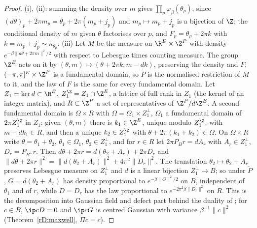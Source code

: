 \begin{proof}
(i), (ii): summing the density over $m$ gives $\prod_p\varphi_\beta(\theta_p)$,
since $(d\theta)_p+2\pi m_p=\theta_p+2\pi(m_p+j_p)$ and $m_p\mapsto m_p+j_p$
is a bijection of $\Z$; the conditional density of $m$ given $\theta$
factorises over $p$, and $F_p=\theta_p+2\pi k$ with $k=m_p+j_p\sim\kappa_{
\theta_p}$. (iii) Let $M$ be the measure on $\R^E\times\Z^P$ with density
$e^{-\beta\lVert d\theta+2\pi m\rVert^2/2}$ with respect to Lebesgue times
counting measure. The group $\Z^E$ acts on it by $(\theta,m)\mapsto(\theta+
2\pi k,m-dk)$, preserving the density and $F$; $(-\pi,\pi]^E\times\Z^P$ is a
fundamental domain, so $\tilde P$ is the normalised restriction of $M$ to it,
and the law of $F$ is the same for every fundamental domain. Let $Z_1=\ker d
\subset\R^E$, $Z_1^{\Z}=Z_1\cap\Z^E$, a lattice of full rank in $Z_1$ (the
kernel of an integer matrix), and $R\subset\Z^P$ a set of representatives of
$\Z^P/d\Z^E$. A second fundamental domain is $\Omega\times R$ with $\Omega=
\Omega_1\times Z_1^\perp$, $\Omega_1$ a fundamental domain of $2\pi Z_1^{\Z}$
in $Z_1$: given $(\theta,m)$ there is $k_1\in\Z^E$, unique modulo $Z_1^{\Z}$,
with $m-dk_1\in R$, and then a unique $k_2\in Z_1^{\Z}$ with $\theta+2\pi(k_1+
k_2)\in\Omega$. On $\Omega\times R$ write $\theta=\theta_1+\theta_2$, $\theta_1
\in\Omega_1$, $\theta_2\in Z_1^\perp$, and for $r\in R$ let $2\pi P_Br=dA_r$
with $A_r\in Z_1^\perp$, $D_r=P_{B^\perp}r$. Then $d\theta+2\pi r=d(\theta_2+
A_r)+2\pi D_r$ and $\lVert d\theta+2\pi r\rVert^2=\lVert d(\theta_2+A_r)\rVert
^2+4\pi^2\lVert D_r\rVert^2$. The translation $\theta_2\mapsto\theta_2+A_r$
preserves Lebesgue measure on $Z_1^\perp$ and $d$ is a linear bijection
$Z_1^\perp\to B$; so under $\tilde P$, $G=d(\theta_2+A_r)$ has density
proportional to $e^{-\beta\lVert G\rVert^2/2}$ on $B$, independent of
$\theta_1$ and of $r$, while $D=D_r$ has the law proportional to $e^{-2\pi^2
\beta\lVert D_r\rVert^2}$ on $R$. This is the decomposition into Gaussian
field and defect part behind the duality of \cite[Sect.~2]{FS82}; for $c\in
B$, $\ip cD=0$ and $\ip cG$ is centred Gaussian with variance $\beta^{-1}
\lVert c\rVert^2$ (Theorem~\ref{rD:maxwell}, $\Pi c=c$).
\end{proof}

